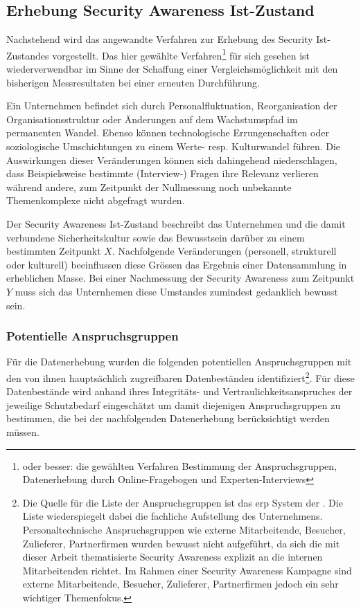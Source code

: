 \documentclass[../../main.tex]{subfiles}
\begin{document}
\subsection{Erhebung Security Awareness Ist-Zustand}

\begin{sloppypar}
Nachstehend wird das angewandte Verfahren zur Erhebung des Security Ist-Zustandes vorgestellt. Das hier gewählte Verfahren\footnote{oder besser: die gewählten Verfahren Bestimmung der Anspruchsgruppen, Datenerhebung durch Online-Fragebogen und Experten-Interviews} für sich gesehen ist wiederverwendbar im Sinne der Schaffung einer Vergleichsmöglichkeit mit den bisherigen Messresultaten bei einer erneuten Durchführung.

Ein Unternehmen befindet sich durch Personalfluktuation, Reorganisation der Organisationsstruktur oder Änderungen auf dem Wachstumspfad im permanenten Wandel. Ebenso können technologische Errungenschaften oder soziologische Umschichtungen zu einem Werte- resp. Kulturwandel führen. Die Auswirkungen dieser Veränderungen können sich dahingehend niederschlagen, dass Beispielsweise bestimmte (Interview-) Fragen ihre Relevanz verlieren während andere, zum Zeitpunkt der Nullmessung noch unbekannte Themenkomplexe nicht abgefragt wurden. 

Der Security Awareness Ist-Zustand beschreibt das Unternehmen und die damit verbundene Sicherheitskultur sowie das Bewusstsein darüber zu einem bestimmten Zeitpunkt $X$. Nachfolgende Veränderungen (personell, strukturell oder kulturell) beeinflussen diese Grössen das Ergebnis einer Datensammlung in erheblichen Masse. Bei einer Nachmessung der Security Awareness zum Zeitpunkt $Y$ muss sich das Unternhemen diese Umstandes zumindest gedanklich bewusst sein.
\end{sloppypar}

\subsubsection{Potentielle Anspruchsgruppen}

\begin{sloppypar}
Für die Datenerhebung wurden die folgenden potentiellen Anspruchsgruppen mit den von ihnen hauptsächlich zugreifbaren Datenbeständen identifiziert\footnote{Die Quelle für die Liste der Anspruchsgruppen ist das \acrshort{erp} System der \companylong. Die Liste wiederspiegelt dabei die fachliche Aufstellung des Unternehmens. Personaltechnische Anspruchsgruppen wie externe Mitarbeitende, Besucher, Zulieferer, Partnerfirmen wurden bewusst nicht aufgeführt, da sich die mit dieser Arbeit thematisierte Security Awareness explizit an die internen Mitarbeitenden richtet. Im Rahmen einer Security Awareness Kampagne sind externe Mitarbeitende, Besucher, Zulieferer, Partnerfirmen jedoch ein sehr wichtiger Themenfokus.}. Für diese Datenbestände wird anhand ihres Integritäts- und Vertraulichkeitsanspruches der jeweilige Schutzbedarf eingeschätzt um damit diejenigen Anspruchsgruppen zu bestimmen, die bei der nachfolgenden Datenerhebung berücksichtigt werden müssen.
\end{sloppypar}
\end{document}
